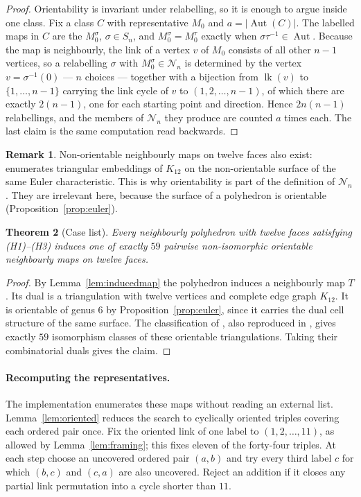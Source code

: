 \documentclass[11pt,reqno]{amsart}
\theoremstyle{plain}
\newtheorem{theorem}{Theorem}[section]
\theoremstyle{definition}
\newtheorem{remark}[theorem]{Remark}
\newcommand{\Aut}{\operatorname{Aut}}
\newcommand{\link}{\operatorname{lk}}
\begin{document}
\begin{proof}
Orientability is invariant under relabelling, so it is enough to argue inside one class. Fix a class
$C$ with representative $M_0$ and $a=|\Aut(C)|$. The labelled maps in $C$ are the
$M_0^{\sigma}$, $\sigma\in S_n$, and $M_0^{\sigma}=M_0^{\tau}$ exactly when $\sigma\tau^{-1}\in\Aut$.
Because the map is neighbourly, the link of a vertex $v$ of $M_0$ consists of all other $n-1$
vertices, so a relabelling $\sigma$ with $M_0^\sigma\in\mathcal N_n$ is determined by the vertex
$v=\sigma^{-1}(0)$ --- $n$ choices --- together with a bijection from $\link(v)$ to
$\{1,\dots,n-1\}$ carrying the link cycle of $v$ to $(1,2,\dots,n-1)$, of which there are exactly
$2(n-1)$, one for each starting point and direction. Hence $2n(n-1)$ relabellings, and the members of
$\mathcal N_n$ they produce are counted $a$ times each. The last claim is the same computation read
backwards.
\end{proof}

\begin{remark}
Non-orientable neighbourly maps on twelve faces also exist:
\cite[Theorem~4]{EllinghamStephens2005} enumerates triangular embeddings of $K_{12}$
on the non-orientable surface of the same Euler characteristic.
This is why orientability is part of the definition of $\mathcal{N}_n$. They are
irrelevant here, because the surface of a polyhedron is orientable
(Proposition~\ref{prop:euler}).
\end{remark}

\begin{theorem}[Case list]\label{thm:59}
Every neighbourly polyhedron with twelve faces satisfying \textup{(H1)}--\textup{(H3)} induces one of
exactly $59$ pairwise non-isomorphic orientable neighbourly maps on twelve faces.
\end{theorem}

\begin{proof}
By Lemma~\ref{lem:inducedmap} the polyhedron induces a neighbourly map $T$.
Its dual is a triangulation with twelve vertices and complete edge graph $K_{12}$.
It is orientable of genus $6$ by Proposition~\ref{prop:euler}, since it carries the
dual cell structure of the same surface. The classification of
\cite{AltshulerBokowskiSchuchert1996}, also reproduced in
\cite[Theorem 4]{EllinghamStephens2005}, gives exactly $59$ isomorphism classes
of these orientable triangulations. Taking their combinatorial duals gives the claim.
\end{proof}

\paragraph{Recomputing the representatives.}
The implementation enumerates these maps without reading an external list.
Lemma~\ref{lem:oriented} reduces the search to cyclically oriented triples covering
each ordered pair once. Fix the oriented link of one label to $(1,2,\dots,11)$,
as allowed by Lemma~\ref{lem:framing}; this fixes eleven of the forty-four triples.
At each step choose an uncovered ordered pair $(a,b)$ and try every third label $c$
for which $(b,c)$ and $(c,a)$ are also uncovered. Reject an addition if it closes
any partial link permutation into a cycle shorter than $11$.
\end{document}
